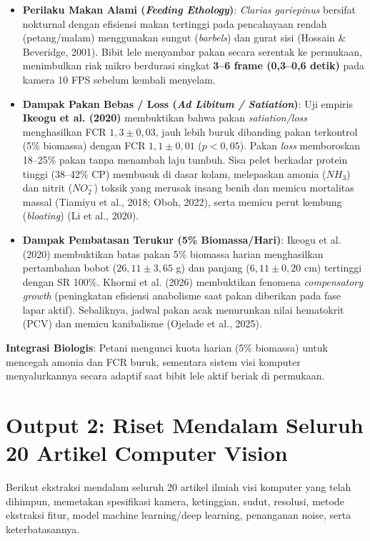 \documentclass[10pt,a4paper]{article}
\begin{document}
\begin{itemize}[leftmargin=*,itemsep=1pt,topsep=1pt]
    \item \textbf{Perilaku Makan Alami (\textit{Feeding Ethology})}: \textit{Clarias gariepinus} bersifat nokturnal dengan efisiensi makan tertinggi pada pencahayaan rendah (petang/malam) menggunakan sungut (\textit{barbels}) dan gurat sisi (Hossain \& Beveridge, 2001). Bibit lele menyambar pakan secara serentak ke permukaan, menimbulkan riak mikro berdurasi singkat \textbf{3--6 frame (0,3--0,6 detik)} pada kamera 10 FPS sebelum kembali menyelam.
    \item \textbf{Dampak Pakan Bebas / Loss (\textit{Ad Libitum / Satiation})}: Uji empiris \textbf{Ikeogu et al. (2020)} membuktikan bahwa pakan \textit{satiation/loss} menghasilkan FCR \textbf{$1,3 \pm 0,03$}, jauh lebih buruk dibanding pakan terkontrol (5\% biomassa) dengan FCR \textbf{$1,1 \pm 0,01$} ($p < 0,05$). Pakan \textit{loss} memboroskan 18--25\% pakan tanpa menambah laju tumbuh. Sisa pelet berkadar protein tinggi (38--42\% CP) membusuk di dasar kolam, melepaskan amonia ($NH_3$) dan nitrit ($NO_2^-$) toksik yang merusak insang benih dan memicu mortalitas massal (Tiamiyu et al., 2018; Oboh, 2022), serta memicu perut kembung (\textit{bloating}) (Li et al., 2020).
    \item \textbf{Dampak Pembatasan Terukur (5\% Biomassa/Hari)}: Ikeogu et al. (2020) membuktikan batas pakan 5\% biomassa harian menghasilkan pertambahan bobot ($26,11 \pm 3,65$ g) dan panjang ($6,11 \pm 0,20$ cm) tertinggi dengan SR 100\%. Khormi et al. (2026) membuktikan fenomena \textit{compensatory growth} (peningkatan efisiensi anabolisme saat pakan diberikan pada fase lapar aktif). Sebaliknya, jadwal pakan acak menurunkan nilai hematokrit (PCV) dan memicu kanibalisme (Ojelade et al., 2025).
\end{itemize}

\textbf{Integrasi Biologis}: Petani mengunci kuota harian (5\% biomassa) untuk mencegah amonia dan FCR buruk, sementara sistem visi komputer menyalurkannya secara adaptif saat bibit lele aktif beriak di permukaan.

\newpage

\section{Output 2: Riset Mendalam Seluruh 20 Artikel Computer Vision}
Berikut ekstraksi mendalam seluruh 20 artikel ilmiah visi komputer yang telah dihimpun, memetakan spesifikasi kamera, ketinggian, sudut, resolusi, metode ekstraksi fitur, model machine learning/deep learning, penanganan noise, serta keterbatasannya.
\end{document}

